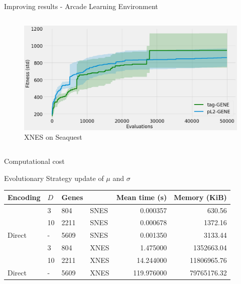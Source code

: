 \begin{frame}{\tciii{} Improving results - Arcade Learning Environment}
{\begin{columns}
      \begin{column}{0.45\linewidth}
        \begin{center}
          \begin{figure}
              \centering
   \includegraphics[width=.9\linewidth]{images/GENE/plots/seaquest - 128-64-64-18 - xnes.png}
        \caption{XNES on Seaquest}
          \end{figure}
        \end{center}
      \end{column}
    \end{columns}
    }
  \end{frame}
  
  
  
  \begin{frame}{\tciii{} Computational cost}
    
  \begin{block}{Evolutionary Strategy update of $\mu$ and $\sigma$} 
          \begin{table}
              \begin{tabular}{llllrr}
                      Encoding  & $D$ & Genes &  &  Mean time (s) &  Memory (KiB) \\
                  \midrule
                  \pltwogene{} &   3 & 804 & SNES &       0.000357 &                 630.56 \\
                  \pltwogene{} &  10 & 2211 & SNES &       0.000678 &                1372.16 \\
                   Direct &   - & 5609 & SNES &       0.001350 &                3133.44 \\
                  \pltwogene{} &   3 & 804 & XNES &       1.475000 &             1352663.04 \\
                  \pltwogene{} &  10 & 2211 & XNES &      14.244000 &            11806965.76 \\
                   Direct &   - & 5609 & XNES &     119.976000 &            79765176.32 \\
                  \end{tabular}
          \end{table}
      \end{block}
  \end{frame}
  

